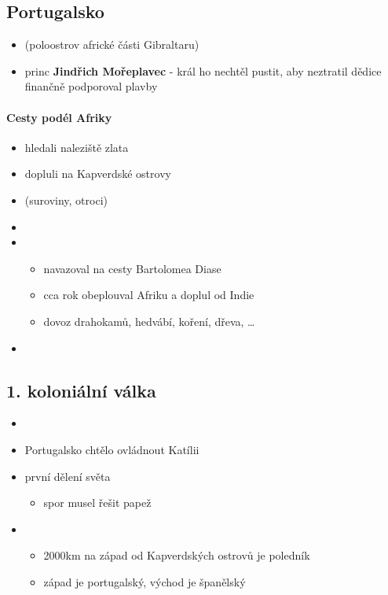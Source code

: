 \subsection{Portugalsko}
\begin{itemize}
\item {} (poloostrov africké části Gibraltaru)
\item princ \textbf{Jindřich Mořeplavec} - král ho nechtěl pustit, aby neztratil dědice \ra finančně podporoval plavby
\end{itemize}


\paragraph{Cesty podél Afriky}
\begin{itemize}
\item hledali naleziště zlata
\item dopluli na Kapverdské ostrovy
\end{itemize}

\begin{itemize}
\item {} (suroviny, otroci)
\item {}
\item {}
	\begin{itemize}
	\item navazoval na cesty Bartolomea Diase
	\item cca rok obeplouval Afriku a doplul od Indie
	\item[\ra] dovoz drahokamů, hedvábí, koření, dřeva, \ldots
	\end{itemize}
\item {}
\end{itemize}



\subsection{1. koloniální válka}
\begin{itemize}
\item {}
\item Portugalsko chtělo ovládnout Katílii
\item[\ra] první dělení světa
	\begin{itemize}
	\item spor musel řešit papež
	\end{itemize}
\item {}
	\begin{itemize}
	\item 2000km na západ od Kapverdských ostrovů je poledník
	\item západ je portugalský, východ je španělský
	\end{itemize}
\end{itemize}


